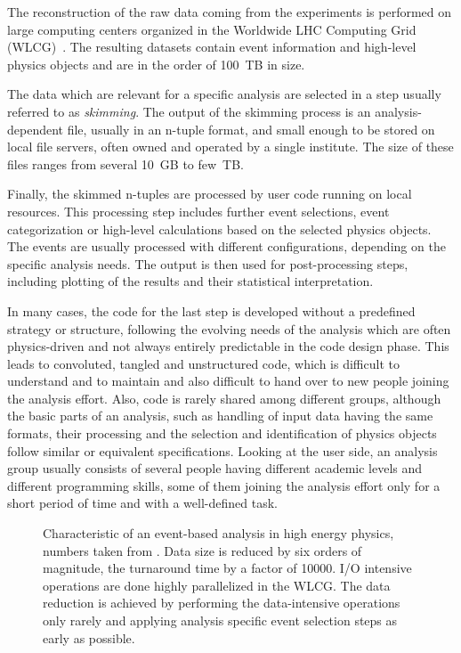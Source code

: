 \documentclass[3p]{elsarticle}
\begin{document}
The reconstruction of the raw data coming from the experiments is performed on large computing centers organized in the Worldwide LHC Computing Grid (WLCG)~\cite{wlcg}.
The resulting datasets contain event information and high-level physics objects and are in the order of \SI{100}{TB} in size.

The data which are relevant for a specific analysis are selected in a step usually referred to as \textit{skimming}.
The output of the skimming process is an analysis-dependent file, usually in an n-tuple format, and small enough to be stored on local file servers, often owned and operated by a single institute.
The size of these files ranges from several \SI{10}{GB} to few~TB.

Finally, the skimmed n-tuples are processed by user code running on local resources.
This processing step includes further event selections, event categorization or high-level calculations based on the selected physics objects.
The events are usually processed with different configurations, depending on the specific analysis needs.
The output is then used for post-processing steps, including plotting of the results and their statistical interpretation.

In many cases, the code for the last step is developed without a predefined strategy or structure, following the evolving needs of the analysis which are often physics-driven and not always entirely predictable in the code design phase.
This leads to convoluted, tangled and unstructured code, which is difficult to understand and to maintain and also difficult to hand over to new people joining the analysis effort.
Also, code is rarely shared among different groups, although the basic parts of an analysis, such as handling of input data having the same formats, their processing and the selection and identification of physics objects follow similar or equivalent specifications.
Looking at the user side, an analysis group usually consists of several people having different academic levels and different programming skills, some of them joining the analysis effort only for a short period of time and with a well-defined task.

\begin{figure}[t]
\centering 
\caption[Characteristics of an event-based analysis in high energy physics]{Characteristic of an event-based analysis in high energy physics, numbers taken from \cite{joram_phd}.
Data size is reduced by six orders of magnitude, the turnaround time by a factor of 10000.
I/O intensive operations are done highly parallelized in the WLCG.
The data reduction is achieved by performing the data-intensive operations only rarely and applying analysis specific event selection steps as early as possible.}
\label{figure_analysis_steps}
\end{figure}
\end{document}
